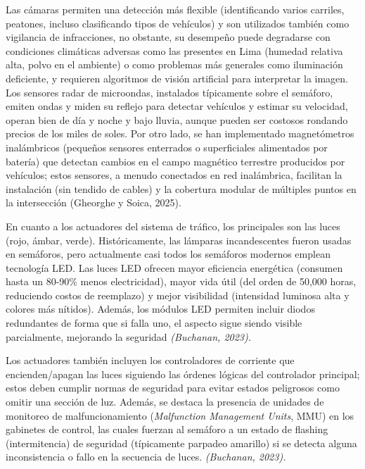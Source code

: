 \documentclass[12pt,a4paper,oneside]{report}
\begin{document}
Las cámaras permiten una detección más flexible (identificando varios carriles, peatones, incluso clasificando tipos de vehículos) y son utilizados también como vigilancia de infracciones, no obstante, su desempeño puede degradarse con condiciones climáticas adversas como las presentes en Lima (humedad relativa alta, polvo en el ambiente) o como problemas más generales como iluminación deficiente, y requieren algoritmos de visión artificial para interpretar la imagen. Los sensores radar de microondas, instalados típicamente sobre el semáforo, emiten ondas y miden su reflejo para detectar vehículos y estimar su velocidad, operan bien de día y noche y bajo lluvia, aunque pueden ser costosos rondando precios de los miles de soles. Por otro lado, se han implementado magnetómetros inalámbricos (pequeños sensores enterrados o superficiales alimentados por batería) que detectan cambios en el campo magnético terrestre producidos por vehículos; estos sensores, a menudo conectados en red inalámbrica, facilitan la instalación (sin tendido de cables) y la cobertura modular de múltiples puntos en la intersección\hspace{0pt} (Gheorghe y Soica, 2025).

En cuanto a los actuadores del sistema de tráfico, los principales son las luces (rojo, ámbar, verde). Históricamente, las lámparas incandescentes fueron usadas en semáforos, pero actualmente casi todos los semáforos modernos emplean tecnología LED. Las luces LED ofrecen mayor eficiencia energética (consumen hasta un 80-90\% menos electricidad), mayor vida útil (del orden de 50,000 horas, reduciendo costos de reemplazo) y mejor visibilidad (intensidad luminosa alta y colores más nítidos). Además, los módulos LED permiten incluir diodos redundantes de forma que si falla uno, el aspecto sigue siendo visible parcialmente, mejorando la seguridad\hspace{0pt} \emph{(Buchanan, 2023).\\
}

Los actuadores también incluyen los controladores de corriente que encienden/apagan las luces siguiendo las órdenes lógicas del controlador principal; estos deben cumplir normas de seguridad para evitar estados peligrosos como omitir una sección de luz. Además, se destaca la presencia de unidades de monitoreo de malfuncionamiento (\emph{Malfunction Management Units}, MMU) en los gabinetes de control, las cuales fuerzan al semáforo a un estado de flashing (intermitencia) de seguridad (típicamente parpadeo amarillo) si se detecta alguna inconsistencia o fallo en la secuencia de luces. \emph{(Buchanan, 2023).}
\end{document}
